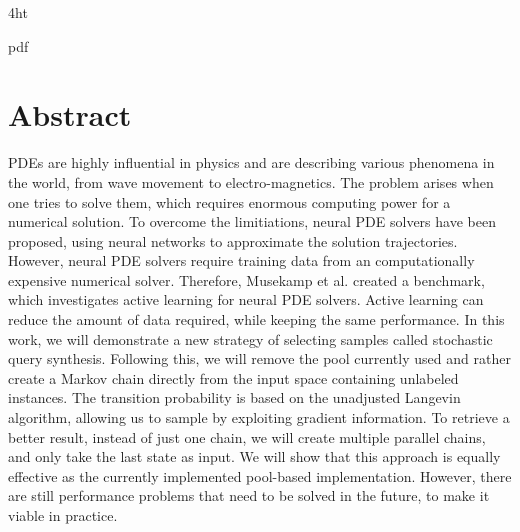 \documentclass[
  a4paper,  %
  twoside,  %
  bibliography=totoc,
  headsepline,
  cleardoublepage=empty,
  parskip=half,
  draft=false
]{scrbook}
\begin{document}
\iftex4ht
  \Configure{$}{\PicMath}{\EndPicMath}{}

  {pdf}
  {%
  }
\fi



\Titelblatt

\pagestyle{preamble}
\renewcommand*{\chapterpagestyle}{preamble}



\section*{Abstract}

PDEs are highly influential in physics and are describing various phenomena
in the world, from wave movement to electro-magnetics. The problem arises
when one tries to solve them, which requires enormous computing power for a
numerical solution. To overcome the limitiations, neural PDE solvers have been proposed, 
using neural networks to approximate the solution trajectories. 
However, neural PDE solvers require training data from an computationally expensive numerical solver. Therefore, Musekamp et al. created a benchmark, which
investigates active learning for neural PDE solvers. Active learning can reduce the amount of data required, while keeping the same performance. In this
work, we will demonstrate a new strategy of selecting samples called
stochastic query synthesis. Following this, we will remove the pool currently used and rather 
create a Markov chain directly from the input space containing unlabeled instances.
The transition probability is based on the unadjusted Langevin algorithm, allowing 
us to sample by exploiting gradient information. To retrieve a better result, instead of 
just one chain, we will create multiple parallel chains, and only take the last state as input. 
We will show that this approach is equally effective as the currently implemented pool-based 
implementation. However, there are still performance problems that need to be solved in the future, 
to make it viable in practice.
\end{document}
